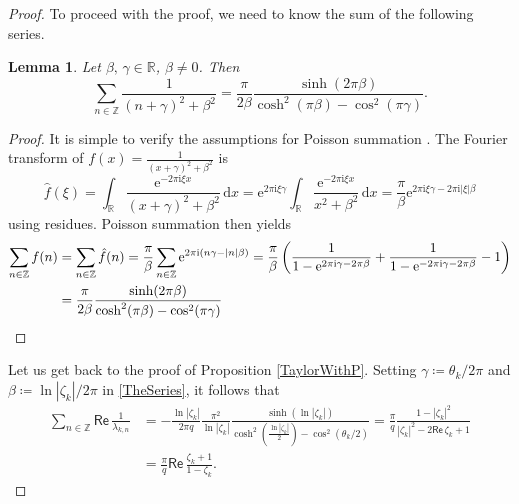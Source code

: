 \documentclass[11pt, a4paper,reqno]{amsart}
\theoremstyle{plain}
\newtheorem{lemma}[theorem]{Lemma}
\theoremstyle{definition}
\theoremstyle{remark}
\newcommand{\dd}{\,\textrm{d}}
\newcommand{\1}{\mathds 1}
\renewcommand{\Re}{\mathsf{Re}\,}
\begin{document}
\begin{proof}
    To proceed with the proof, we need to know the sum of the following series.
    \begin{lemma}
        Let $\beta, \,\gamma \in \mathbb R$, $\beta \neq 0$. Then
        \begin{equation}
            \sum_{n\in\mathbb Z}\frac{1}{(n+\gamma)^2 + \beta^2} = \frac{\pi}{2\beta}\frac{\sinh(2\pi\beta)}{\cosh^2(\pi\beta) - \cos^2(\pi\gamma)}.
            \label{TheSeries}
        \end{equation}
    \end{lemma}
\begin{proof}
    It is simple to verify the assumptions for Poisson summation \cite[Theorem 2.4]{PoissonSum}. The Fourier transform of $f(x) = \frac{1}{(x+\gamma)^2 + \beta^2}$ is
    \[
    \hat f(\xi) = \int_{\mathbb R} \frac{\mathrm{e}^{-2\pi \mathrm{i}\xi x}}{(x+\gamma)^2 + \beta^2} \dd x = \mathrm{e}^{2\pi \mathrm{i}\xi \gamma}\int_{\mathbb R}\frac{\mathrm{e}^{-2\pi \mathrm{i}\xi x}}{x^2 + \beta^2} \dd x = \frac{\pi}{\beta}\mathrm{e}^{2\pi \mathrm{i}\xi \gamma - 2 \pi \mathrm{i} |\xi| \beta}
    \]
    using residues. Poisson summation then yields
    \begin{align*}
    \sum_{n\in \mathbb Z}f(n) &= \sum_{n\in\mathbb Z}\hat f(n) = \frac{\pi}{\beta}\sum_{n\in\mathbb Z}\mathrm{e}^{2 \pi \mathrm{i}(n\gamma - |n|\beta)} = \frac{\pi}{\beta}\left(\frac{1}{1-\mathrm{e}^{2\pi \mathrm{i}\gamma-2\pi\beta}} + \frac{1}{1-\mathrm{e}^{-2\pi\mathrm{i}\gamma-2\pi\beta}} - 1\right) \\
    &= \frac{\pi}{2\beta}\frac{\sinh(2\pi\beta)}{\cosh^2(\pi\beta) - \cos^2(\pi\gamma)} \qedhere
    \end{align*}
\end{proof}

Let us get back to the proof of Proposition \ref{TaylorWithP}. Setting $\gamma \coloneqq \theta_k/2\pi$ and $\beta \coloneqq \ln|\zeta_k|/2\pi$ in \eqref{TheSeries}, it follows that
\begin{align}
    \sum_{n\in\mathbb Z}\Re \frac{1}{\lambda_{k,n}} & = -\frac{\ln|\zeta_k|}{2\pi q}\frac{\pi^2}{\ln|\zeta_k|}\frac{\sinh\left(\ln|\zeta_k|\right)}{\cosh^2\left(\frac{\ln|\zeta_k|}{2}\right)-\cos^2(\theta_k/2)} = \frac{\pi}{q}\frac{1-|\zeta_k|^2}{|\zeta_k|^2 - 2\Re \zeta_k + 1} \nonumber\\
    & =\frac{\pi}{q}\Re\frac{\zeta_k + 1}{1- \zeta_k}.
    \label{SpectralTraceComputation}
\end{align}


\end{proof}
\end{document}
